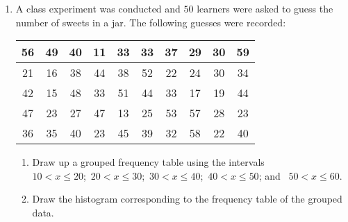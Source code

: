 \begin{exercises}{}{
    \begin{enumerate}[itemsep=5pt, label=\textbf{\arabic*}. ]
    \item  A class experiment was conducted and $50$ learners were asked to
      guess the number of sweets in a jar. The following guesses were
      recorded:
      \\
      \begin{center}
        \begin{tabular}{|c|c|c|c|c|c|c|c|c|c|} \hline
          56 & 49 & 40 & 11 & 33 & 33 & 37 & 29 & 30 & 59 \\ \hline
          21 & 16 & 38 & 44 & 38 & 52 & 22 & 24 & 30 & 34 \\\hline
          42 & 15 & 48 & 33 & 51 & 44 & 33 & 17 & 19 & 44 \\\hline
          47 & 23 & 27 & 47 & 13 & 25 & 53 & 57 & 28 & 23 \\\hline
          36 & 35 & 40 & 23 & 45 & 39 & 32 & 58 & 22 & 40 \\\hline
        \end{tabular}
      \end{center}
      \begin{enumerate}[noitemsep, label=\textbf{(\alph*)} ]
      \item
        Draw up a grouped frequency table using the intervals\\
        $10 < x \leq 20$;\ $20 < x \leq 30$;\ $30 < x \leq 40$;\ 
        $40 < x \leq 50$; and \ $50 < x \leq 60$.
      \item Draw the histogram corresponding to the frequency table of the
        grouped data.
      \end{enumerate}
    \end{enumerate}
}
\end{exercises}


